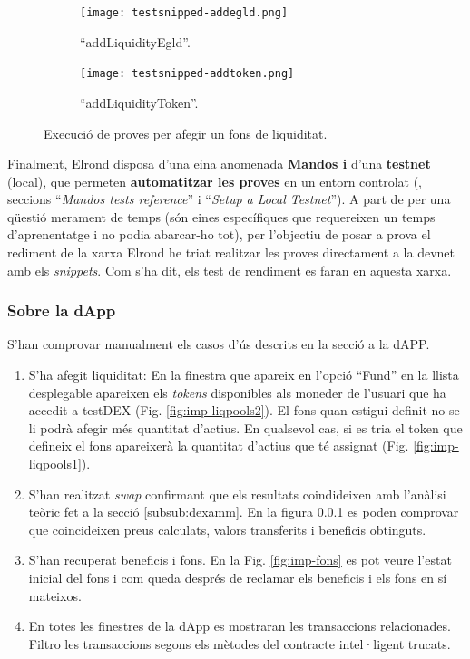 \documentclass[11pt,a4paper]{article}
\begin{document}
\begin{figure}[!htb]
	\begin{subfigure}[b]{0.5\textwidth}
	  \texttt{[image: testsnipped-addegld.png]}
	  \caption{``addLiquidityEgld''.}\label{fig:test-addegld}
	\end{subfigure}\hfill
	\begin{subfigure}[b]{0.47\textwidth}
	  \texttt{[image: testsnipped-addtoken.png]}
	  \caption{``addLiquidityToken''.}\label{fig:test-addtoken}
	\end{subfigure}\hfill
	\caption{Execució de proves per afegir un fons de liquiditat.}
\end{figure}

Finalment, Elrond disposa d'una eina anomenada \textbf{Mandos i} d'una \textbf{testnet} (local), que permeten \textbf{automatitzar les proves} en un entorn controlat (\cite{elrond2022}, seccions ``\textit{Mandos tests reference}'' i  ``\textit{Setup a Local Testnet}''). A part de per una qüestió merament de temps (són eines específiques que requereixen un temps d'aprenentatge i no podia abarcar-ho tot), per l'objectiu de posar a prova el rediment de la xarxa Elrond he triat realitzar les proves directament a la devnet amb els \textit{snippets}. Com s'ha dit, els test de rendiment es faran en aquesta xarxa.

\subsubsection{Sobre la dApp}
S'han comprovar manualment els casos d'ús descrits en la secció \label{subsub:casosdus} a la dAPP.
\begin{enumerate}
\item S'ha afegit liquiditat: En la finestra que apareix en l'opció ``Fund'' en la llista desplegable apareixen els \textit{tokens} disponibles als moneder de l'usuari que ha accedit a testDEX (Fig. \ref{fig:imp-liqpools2}). El fons quan estigui definit no se li podrà afegir més quantitat d'actius. En qualsevol cas, si es tria el token que defineix el fons apareixerà la quantitat d'actius que té assignat (Fig. \ref{fig:imp-liqpools1}).
\item S'han realitzat \textit{swap} confirmant que els resultats coindideixen amb l'anàlisi teòric fet a la secció \ref{subsub:dexamm}. En la figura \ref{} es poden comprovar que coincideixen preus calculats, valors transferits i beneficis obtinguts.
\item S'han recuperat beneficis i fons. En la Fig. \ref{fig:imp-fons} es pot veure l'estat inicial del fons i com queda després de reclamar els beneficis i els fons en sí mateixos.
\item En totes les finestres de la dApp es mostraran les transaccions relacionades. Filtro les transaccions segons els mètodes del contracte intel·ligent trucats.
\end{enumerate}
\end{document}
